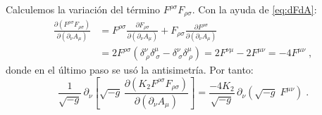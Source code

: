             Calculemos la variación del término $F^{\rho\sigma}F_{\rho\sigma}$.
            Con la ayuda de \eqref{eq:dFdA}:
            \begin{align*}
                \frac{\partial(F^{\rho\sigma}F_{\rho\sigma})}{\partial(\partial_{\nu}A_{\mu})}
                &= F^{\rho\sigma}
                \frac{\partial F_{\rho\sigma}}{\partial(\partial_{\nu}A_{\mu})}
                + F_{\rho\sigma}
                \frac{\partial F^{\rho\sigma}}{\partial(\partial_{\nu}A_{\mu})}\\
                &= 2F^{\rho\sigma}\!\left(\delta^{\nu}_{\ \rho}\delta^{\mu}_{\ \sigma}
                                        -\delta^{\nu}_{\ \sigma}\delta^{\mu}_{\ \rho}\right)
                = 2F^{\nu\mu} - 2F^{\mu\nu} = -4F^{\mu\nu}\;,
            \end{align*}
            donde en el último paso se usó la antisimetría.  Por tanto:
            \begin{equation}\label{eq:VarFF}
                \frac{1}{\sqrt{-g}}\,
                \partial_{\nu}\!\left[\sqrt{-g}\,
                \frac{\partial(K_2 F^{\rho\sigma}F_{\rho\sigma})}
                    {\partial(\partial_{\nu}A_{\mu})}\right]
                = \frac{-4K_2}{\sqrt{-g}}\,\partial_{\nu}\!\left(\sqrt{-g}\;F^{\mu\nu}\right)\;.
            \end{equation}

